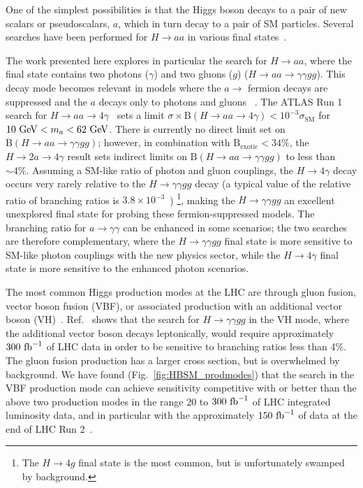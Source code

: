 One of the simplest possibilities is that the Higgs boson decays to a pair of 
new scalars or pseudoscalars, $a$, which in turn decay to a pair of SM particles.
Several searches have been performed for $H\rightarrow a a$ in various final states~\cite{Khachatryan:2017mnf,Aad:2015sva,Aad:2015oqa}.

The work presented here explores in particular the search for $H\rightarrow a a$, where the final state contains two photons ($\gamma$) and two gluons ($g$) ($H\rightarrow aa \rightarrow \gamma\gamma gg$).
This decay mode becomes relevant in models where the $a\rightarrow$ fermion decays are suppressed 
and the $a$ decays only to photons and gluons
~\cite{Curtin:2013fra,hep-ph/0703247}.
The ATLAS Run 1 search for $H\rightarrow aa \to 4\gamma$~\cite{Aad:2015bua} sets 
a limit $\sigma\times \text{B}(H\to aa\rightarrow 4\gamma)<10^{-3}\sigma_\text{SM}$ 
for $10~\mathrm{GeV}<m_a<62~\mathrm{GeV}$.
There is currently no direct limit set on $\text{B}(H\rightarrow aa\rightarrow \gamma\gamma gg)$;
however, in combination with $\text{B}_\text{exotic}<34\%$, 
the $H\rightarrow 2a \to 4\gamma$ result sets indirect limits on $\text{B}(H\rightarrow aa\rightarrow \gamma\gamma gg)$ to less than $\sim4\%$.
Assuming a SM-like ratio of photon and gluon couplings, 
the $H\rightarrow 4\gamma$ decay occurs very rarely relative to the $H\rightarrow \gamma\gamma gg$ decay (a typical value of the relative ratio of branching ratios is $3.8\times10^{-3}$~\cite{hep-ph/0703247})
\footnote{The $H\rightarrow 4g$ final state is the most common, but is unfortunately swamped by background.},
making the $H\rightarrow \gamma\gamma gg$ an excellent unexplored final state for probing these fermion-suppressed models.
The branching ratio for $a\rightarrow \gamma\gamma$ can be enhanced in some scenarios;
the two searches are therefore complementary, 
where the $H\rightarrow \gamma\gamma gg$ final state is more sensitive to SM-like photon couplings 
with the new physics sector, 
while the $H\rightarrow 4\gamma$ final state is more sensitive to the enhanced photon scenarios. 

The most common Higgs production modes at the LHC are through gluon fusion, vector boson fusion (VBF), or associated production with an additional vector boson (VH)~\cite{Dittmaier:2011ti}.
Ref.~\cite{hep-ph/0703247} shows that the search for $H \to \gamma\gamma gg$ in the VH mode, 
where the additional vector boson
decays leptonically, would require approximately $300~\mathrm{fb}^{-1}$ of LHC data in order to be sensitive to branching ratios less than 4\%. 
The gluon fusion production has a larger cross section, 
but is overwhelmed by background.
We have found (Fig.~\ref{fig:HBSM_prodmodes}) that the search in the VBF production 
mode can achieve sensitivity competitive with or better than the above two production modes in the range $20$ to $300~\mathrm{fb}^{-1}$ of LHC integrated luminosity data,
and in particular with the approximately $150~\mathrm{fb}^{-1}$ of data at the end of LHC Run 2~\cite{lhc-commissioning}.

